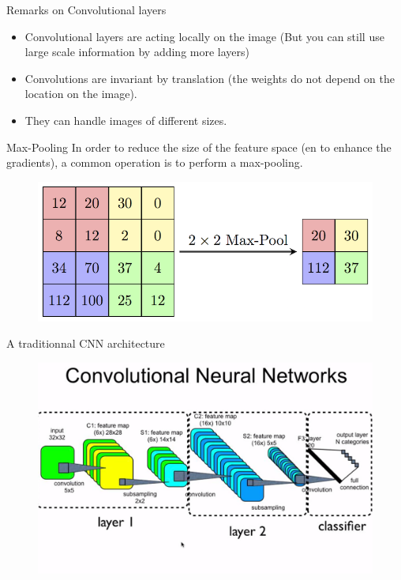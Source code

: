 \documentclass[handout, 10pt]{beamer}
\begin{document}
\begin{frame}{Remarks on Convolutional layers}
\begin{itemize}
    \item Convolutional layers are acting locally on the image (But you can still use large scale information by adding more layers)
    \item Convolutions are invariant by translation (the weights do not depend on the location on the image).
    \item They can handle images of different sizes.
    
\end{itemize}
    
\end{frame}
\begin{frame}{Max-Pooling}
    In order to reduce the size of the feature space (en to enhance the gradients), a common operation is to perform a max-pooling.
    \begin{figure}
   \centering
    \includegraphics[width=.6\textwidth]{fig/L2/MaxpoolSample2.png}
\end{figure}
\end{frame}

\begin{frame}[fragile]{A traditionnal CNN architecture}
    \begin{figure}
\centering
    \includegraphics[width=.8\textwidth,trim={0 0cm 0cm 3cm},clip]{fig/L2/CNN.png}
\end{figure}
\end{frame}
\end{document}
